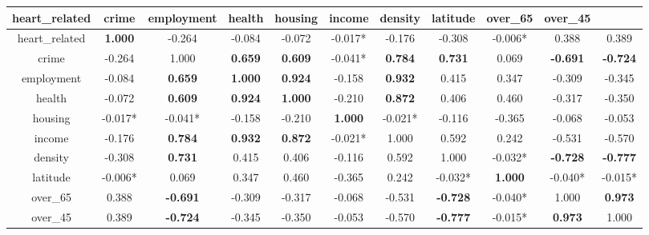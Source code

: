 \begin{tabular}{|c|c|c|c|c|c|c|c|c|c|c|}
	\hline
	heart\_related & crime & employment & health & housing & income & density & latitude & over\_65 & over\_45\\
	\hline
	heart\_related& \textbf{1.000}& -0.264& -0.084& -0.072& -0.017*& -0.176& -0.308& -0.006*& 0.388& 0.389\\ 
	\hline
	crime& -0.264& 1.000& \textbf{0.659}& \textbf{0.609}& -0.041*& \textbf{0.784}& \textbf{0.731}& 0.069& \textbf{-0.691}& \textbf{-0.724}\\ 
	\hline
	employment& -0.084& \textbf{0.659}& \textbf{1.000}& \textbf{0.924}& -0.158& \textbf{0.932}& 0.415& 0.347& -0.309& -0.345\\ 
	\hline
	health& -0.072& \textbf{0.609}& \textbf{0.924}& \textbf{1.000}& -0.210& \textbf{0.872}& 0.406& 0.460& -0.317& -0.350\\ 
	\hline
	housing& -0.017*& -0.041*& -0.158& -0.210& \textbf{1.000}& -0.021*& -0.116& -0.365& -0.068& -0.053\\ 
	\hline
	income& -0.176& \textbf{0.784}& \textbf{0.932}& \textbf{0.872}& -0.021*& 1.000& 0.592& 0.242& -0.531& -0.570\\ 
	\hline
	density& -0.308& \textbf{0.731}& 0.415& 0.406& -0.116& 0.592& 1.000& -0.032*& \textbf{-0.728}& \textbf{-0.777}\\ 
	\hline
	latitude& -0.006*& 0.069& 0.347& 0.460& -0.365& 0.242& -0.032*& \textbf{1.000}& -0.040*& -0.015*\\ 
	\hline
	over\_65& 0.388& \textbf{-0.691}& -0.309& -0.317& -0.068& -0.531& \textbf{-0.728}& -0.040*& 1.000& \textbf{0.973}\\ 
	\hline
	over\_45& 0.389& \textbf{-0.724}& -0.345& -0.350& -0.053& -0.570& \textbf{-0.777}& -0.015*& \textbf{0.973}& 1.000\\ 
	\hline
\end{tabular}
